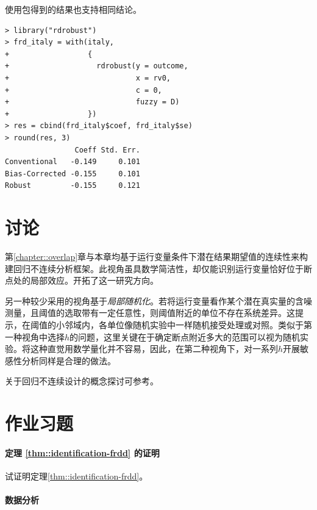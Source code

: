  
 
使用包得到的结果也支持相同结论。 
 
 \begin{lstlisting}
> library("rdrobust")
> frd_italy = with(italy,
+                  {
+                    rdrobust(y = outcome,
+                             x = rv0,
+                             c = 0,
+                             fuzzy = D)
+                  })
> res = cbind(frd_italy$coef, frd_italy$se)
> round(res, 3)
                Coeff Std. Err.
Conventional   -0.149     0.101
Bias-Corrected -0.155     0.101
Robust         -0.155     0.121
 \end{lstlisting}
 
 
 
 \section{讨论}


第\ref{chapter::overlap}章与本章均基于运行变量条件下潜在结果期望值的连续性来构建回归不连续分析框架。此视角虽具数学简洁性，却仅能识别运行变量恰好位于断点处的局部效应。\citet{hahn2001identification}开拓了这一研究方向。

另一种较少采用的视角基于{\it 局部随机化}\citep{cattaneo2015randomization, li2015evaluating}。若将运行变量看作某个潜在真实量的含噪测量，且阈值的选取带有一定任意性，则阈值附近的单位不存在系统差异。这提示，在阈值的小邻域内，各单位像随机实验中一样随机接受处理或对照。类似于第一种视角中选择$h$的问题，这里关键在于确定断点附近多大的范围可以视为随机实验。将这种直觉用数学量化并不容易，因此，在第二种视角下，对一系列$h$开展敏感性分析同样是合理的做法。  


关于回归不连续设计的概念探讨可参考\citet{sekhon2017interpreting}。 



 
\section{作业习题}

\paragraph{定理 \ref{thm::identification-frdd} 的证明}\label{para::proof-theorem-frd}

试证明定理\ref{thm::identification-frdd}。 


\paragraph{数据分析}
 
